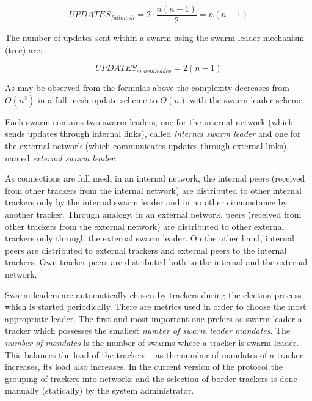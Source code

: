 \begin{equation}\label{updates-fullmesh}
UPDATES_{full mesh} = 2\cdot\frac{n(n-1)}{2} = n(n-1)
\end{equation}


The number of updates sent within a swarm using the swarm leader mechanism
(tree) are:


\begin{equation}\label{updates-swarmleader}
UPDATES_{swarm leader} = 2(n-1)
\end{equation}


As may be observed from the formulas above the complexity decreases from
$O(n^{2})$ in a full mesh update scheme to $O(n)$ with the swarm leader
scheme.

Each swarm contains two swarm leaders, one for the internal network (which
sends updates through internal links), called \textit{internal swarm leader}
and one for the external network (which communicates updates through external
links), named \textit{external swarm leader}.

As connections are full mesh in an internal network, the internal peers
(received from other trackers from the internal network) are distributed to
other internal trackers only by the internal swarm leader and in no other
circumstance by another tracker. Through analogy, in an external network,
peers (received from other trackers from the external network) are distributed
to other external trackers only through the external swarm leader. On the
other hand, internal peers are distributed to external trackers and external
peers to the internal trackers. Own tracker peers are distributed both to the
internal and the external network.

Swarm leaders are automatically chosen by trackers during the election process
which is started periodically. There are metrics used in order to choose the
most appropriate leader. The first and most important one prefers as swarm
leader a tracker which possesses the smallest \textit{number of swarm leader
mandates}. The \textit{number of mandates} is the number of swarms where a
tracker is swarm leader. This balances the load of the trackers -- as the
number of mandates of a tracker increases, its load also increases. In the
current version of the protocol the grouping of trackers into networks and the
selection of border trackers is done manually (statically) by the system
administrator.

